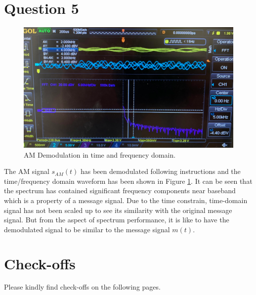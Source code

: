 \documentclass[11pt]{article}
\begin{document}
\section*{Question 5}
\begin{figure}[H]
    \centering
    \includegraphics[scale = 0.65]{Q5.PNG}
    \caption{\label{fig:q5}AM Demodulation in time and frequency domain.}
\end{figure}
The AM signal $s_{AM}(t)$ has been demodulated following instructions and the time/frequency domain waveform has been shown in Figure \ref{fig:q5}. It can be seen that the spectrum has contained significant frequency components near baseband which is a property of a message signal. Due to the time constrain, time-domain signal has not been scaled up to see its similarity with the original message signal. But from the aspect of spectrum performance, it is like to have the demodulated signal to be similar to the message signal $m(t)$. 
\section*{Check-offs}
Please kindly find check-offs on the following pages.

\end{document}
